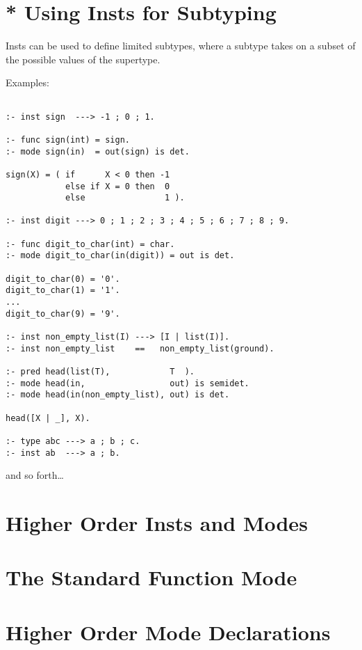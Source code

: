 
\section{* Using Insts for Subtyping}

Insts can be used to define limited subtypes, where a subtype
takes on a subset of the possible values of the supertype.

Examples:
\begin{verbatim}

:- inst sign  ---> -1 ; 0 ; 1.

:- func sign(int) = sign.
:- mode sign(in)  = out(sign) is det.

sign(X) = ( if      X < 0 then -1
            else if X = 0 then  0
            else                1 ).

:- inst digit ---> 0 ; 1 ; 2 ; 3 ; 4 ; 5 ; 6 ; 7 ; 8 ; 9.

:- func digit_to_char(int) = char.
:- mode digit_to_char(in(digit)) = out is det.

digit_to_char(0) = '0'.
digit_to_char(1) = '1'.
...
digit_to_char(9) = '9'.

:- inst non_empty_list(I) ---> [I | list(I)].
:- inst non_empty_list    ==   non_empty_list(ground).

:- pred head(list(T),            T  ).
:- mode head(in,                 out) is semidet.
:- mode head(in(non_empty_list), out) is det.

head([X | _], X).

:- type abc ---> a ; b ; c.
:- inst ab  ---> a ; b.
\end{verbatim}
and so forth\ldots


\section{Higher Order Insts and Modes}



\section{The Standard Function Mode}




\section{Higher Order Mode Declarations}

